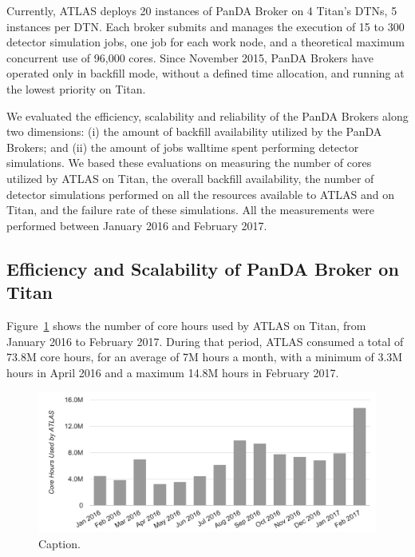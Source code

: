 Currently, ATLAS deploys 20 instances of PanDA Broker on 4 Titan's DTNs, 5
instances per DTN. Each broker submits and manages the execution of 15 to 300
detector simulation jobs, one job for each work node, and a theoretical maximum
concurrent use of 96,000 cores. Since November 2015, PanDA Brokers have operated
only in backfill mode, without a defined time allocation, and running at the
lowest priority on Titan.

We evaluated the efficiency, scalability and reliability of the PanDA Brokers
along two dimensions: (i) the amount of backfill availability utilized by the
PanDA Brokers; and (ii) the amount of jobs walltime spent performing detector
simulations. We based these evaluations on measuring the number of cores
utilized by ATLAS on Titan, the overall backfill availability, the number of
detector simulations performed on all the resources available to ATLAS and on
Titan, and the failure rate of these simulations. All the measurements were
performed between January 2016 and February 2017.

\subsection{Efficiency and Scalability of PanDA Broker on Titan}
\label{ssec:panda_titan}

Figure~\ref{fig:core-hours-utilization} shows the number of core hours used by
ATLAS on Titan, from January 2016 to February 2017. During that period, ATLAS
consumed a total of 73.8M core hours, for an average of 7M hours a month, with a
minimum of 3.3M hours in April 2016 and a maximum 14.8M hours in February 2017.

%

\begin{figure}[htp]
\includegraphics[clip,width=\columnwidth]{figures/cpu_hours.png}
\caption{Caption.}
\label{fig:core-hours-utilization}
\end{figure}

